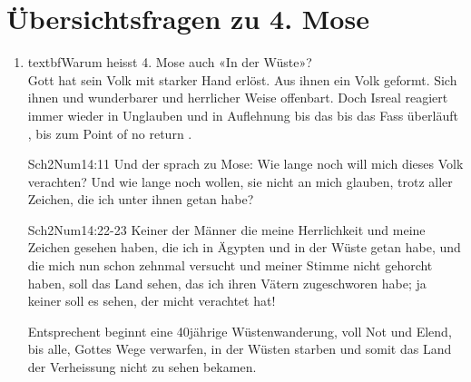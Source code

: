 \section{Übersichtsfragen zu 4. Mose}
\begin{enumerate}
    \item textbf{Warum heisst 4. Mose auch «In der Wüste»?}\\
    Gott hat sein Volk mit starker Hand erlöst. Aus ihnen ein Volk geformt. Sich ihnen und wunderbarer und herrlicher Weise offenbart. Doch Isreal reagiert immer wieder in Unglauben und in Auflehnung bis das \flqq bis das Fass überläuft \frqq, bis zum \flqq Point of no return \frqq.
    \begin{bibeltext}{Sch2}{Num}{14:11}
        Und der \herr sprach zu Mose: Wie lange noch will mich dieses Volk verachten? Und wie lange noch wollen, sie nicht an mich glauben, trotz aller Zeichen, die ich unter ihnen getan habe?
    \end{bibeltext}
    \begin{bibeltext}{Sch2}{Num}{14:22-23}
        Keiner der Männer die meine Herrlichkeit und meine Zeichen gesehen haben, die ich in Ägypten und in der Wüste getan habe, und die mich nun schon zehnmal versucht und meiner Stimme nicht gehorcht haben, soll das Land sehen, das ich ihren Vätern zugeschworen habe; ja keiner soll es sehen, der micht verachtet hat!
    \end{bibeltext}
    Entsprechent beginnt eine 40jährige Wüstenwanderung, voll Not und Elend, bis alle, Gottes Wege verwarfen, in der Wüsten starben und somit das Land der Verheissung nicht zu sehen bekamen.
\end{enumerate}
